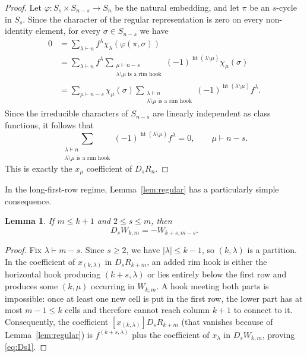 \documentclass[a4paper,draft]{amsart}
\newtheorem{lemma}{Lemma}
\DeclareMathOperator{\rht}{ht}
\begin{document}
\begin{proof}
Let $\varphi:S_s\times S_{n-s}\to S_n$ be the natural embedding, and
let $\pi$ be an $s$-cycle in $S_s$.  Since the character of the regular
representation is zero on every non-identity element, for every
$\sigma\in S_{n-s}$ we have
\begin{align*}
    0&=\sum_{\lambda\vdash n}f^\lambda
       \chi_{\lambda}(\varphi(\pi,\sigma))\\
    &=\sum_{\lambda\vdash n}f^\lambda
      \sum_{\substack{\mu\vdash n-s\\
      \lambda\setminus\mu\text{ is a rim hook}}}
      (-1)^{\rht(\lambda\setminus\mu)}\chi_{\mu}(\sigma)\\
    &=\sum_{\mu\vdash n-s}\chi_{\mu}(\sigma)
      \sum_{\substack{\lambda\vdash n\\
      \lambda\setminus\mu\text{ is a rim hook}}}
      (-1)^{\rht(\lambda\setminus\mu)}f^\lambda.
\end{align*}
Since the irreducible characters of $S_{n-s}$ are linearly independent
as class functions, it follows that
\[
\sum_{\substack{\lambda\vdash n\\
\lambda\setminus\mu\text{ is a rim hook}}}
(-1)^{\rht(\lambda\setminus\mu)}f^\lambda=0,
\qquad \mu\vdash n-s.
\]
This is exactly the $x_\mu$ coefficient of $D_sR_n$.
\end{proof}


In the long-first-row regime, Lemma~\ref{lem:regular} has a
particularly simple consequence.

\begin{lemma}\label{lem:Ds}
If $m\leq k+1$ and $2\leq s\leq m$, then
\begin{equation}\label{eq:Ds1}
    D_sW_{k,m}=-W_{k+s,m-s}.
\end{equation}
\end{lemma}

\begin{proof}
Fix $\lambda\vdash m-s$.  Since $s\geq2$, we have
$|\lambda|\leq k-1$, so $(k,\lambda)$ is a partition.  In the
coefficient of $x_{(k,\lambda)}$ in $D_sR_{k+m}$, an added rim hook
is either the horizontal hook producing $(k+s,\lambda)$ or lies
entirely below the first row and produces some $(k,\mu)$ occurring in
$W_{k,m}$.  A hook meeting both parts is impossible: once at least
one new cell is put in the first row, the lower part has at most $m-1\leq k$
cells and therefore cannot reach column $k+1$ to connect to it.
Consequently, the coefficient $[x_{(k,\lambda)}]D_sR_{k+m}$ (that vanishes because of Lemma~\ref{lem:regular}) is $f^{(k+s,\lambda)}$ plus the coefficient of $x_\lambda$ in $D_sW_{k,m}$, proving \eqref{eq:Ds1}.
\end{proof}
\end{document}
